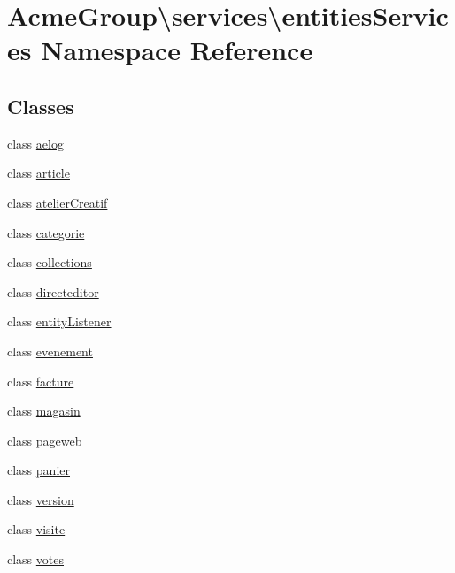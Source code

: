 \hypertarget{namespace_acme_group_1_1services_1_1entities_services}{\section{Acme\+Group\textbackslash{}services\textbackslash{}entities\+Services Namespace Reference}
\label{namespace_acme_group_1_1services_1_1entities_services}
}
\subsection*{Classes}
\begin{DoxyCompactItemize}
\item 
class \hyperlink{class_acme_group_1_1services_1_1entities_services_1_1aelog}{aelog}
\item 
class \hyperlink{class_acme_group_1_1services_1_1entities_services_1_1article}{article}
\item 
class \hyperlink{class_acme_group_1_1services_1_1entities_services_1_1atelier_creatif}{atelier\+Creatif}
\item 
class \hyperlink{class_acme_group_1_1services_1_1entities_services_1_1categorie}{categorie}
\item 
class \hyperlink{class_acme_group_1_1services_1_1entities_services_1_1collections}{collections}
\item 
class \hyperlink{class_acme_group_1_1services_1_1entities_services_1_1directeditor}{directeditor}
\item 
class \hyperlink{class_acme_group_1_1services_1_1entities_services_1_1entity_listener}{entity\+Listener}
\item 
class \hyperlink{class_acme_group_1_1services_1_1entities_services_1_1evenement}{evenement}
\item 
class \hyperlink{class_acme_group_1_1services_1_1entities_services_1_1facture}{facture}
\item 
class \hyperlink{class_acme_group_1_1services_1_1entities_services_1_1magasin}{magasin}
\item 
class \hyperlink{class_acme_group_1_1services_1_1entities_services_1_1pageweb}{pageweb}
\item 
class \hyperlink{class_acme_group_1_1services_1_1entities_services_1_1panier}{panier}
\item 
class \hyperlink{class_acme_group_1_1services_1_1entities_services_1_1version}{version}
\item 
class \hyperlink{class_acme_group_1_1services_1_1entities_services_1_1visite}{visite}
\item 
class \hyperlink{class_acme_group_1_1services_1_1entities_services_1_1votes}{votes}
\end{DoxyCompactItemize}
